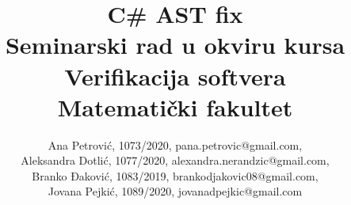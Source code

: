 \documentclass[a4paper]{article}
\begin{document}
	
	\title{C\# AST fix\\ \small{Seminarski rad u okviru kursa\\Verifikacija softvera\\ Matematički fakultet}}
	
	\author{Ana Petrović, 1073/2020, pana.petrovic@gmail.com, \\ Aleksandra Dotlić, 1077/2020, alexandra.nerandzic@gmail.com, \\ Branko Đaković, 1083/2019, brankodjakovic08@gmail.com, \\ Jovana Pejkić, 1089/2020, jovanadpejkic@gmail.com}
	
	\maketitle
	
\end{document}
